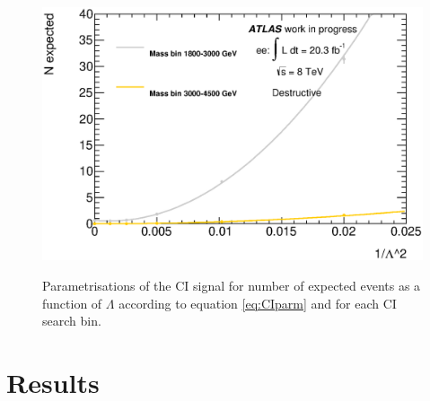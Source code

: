 \begin{figure}[h!]
\begin{center}
	    	\includegraphics[width=0.49\linewidth]{images/parametrisations/NexpFits_plus_elec_himass.eps} \\
	    \end{center}
	   \caption{Parametrisations of the CI signal for number of expected events as a function of $\Lambda$ according to equation \ref{eq:CIparm} and for each CI search bin.}
	   \label{fig:CIparm}
	\end{figure}



\section{Results}

